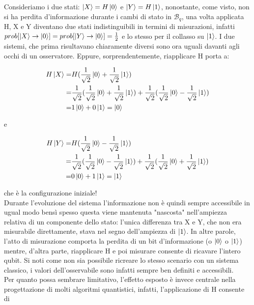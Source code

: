 \documentclass[12pt,a4paper,openright]{report}
\begin{document}
Consideriamo i due stati: $\ket{X} = H\ket0$ e $\ket{Y} = H\ket1$, nonostante, come visto, non si ha perdita d'informazione
durante i cambi di stato in $\mathcal{B}_q$, una volta applicata H, X e Y diventano due stati indistinguibili in termini di misurazioni, 
infatti $prob[\ket{X}\rightarrow\ket0]=prob[\ket{Y}\rightarrow\ket0]=\frac{1}{2}$ e lo stesso per il collasso su $\ket1$. I due sistemi, che prima risultavano chiaramente diversi sono ora uguali
davanti agli occhi di un osservatore. Eppure, sorprendentemente, riapplicare H porta a: 
\begin{center}
    \begin{align*}
        H\ket{X} =& H(\frac{1}{\sqrt2}\ket0 + \frac{1}{\sqrt2}\ket1) \\
                  =&\frac{1}{\sqrt2}(\frac{1}{\sqrt2}\ket0 + \frac{1}{\sqrt2}\ket1) + \frac{1}{\sqrt2}(\frac{1}{\sqrt2}\ket0 - \frac{1}{\sqrt2}\ket1) \\
                  =& 1\ket0 + 0\ket1 =\ket0
    \end{align*}
\end{center}
e
\begin{center}
    \begin{align*}
         H\ket{Y} =& H(\frac{1}{\sqrt2}\ket0 - \frac{1}{\sqrt2}\ket1) \\
                  =&\frac{1}{\sqrt2}(\frac{1}{\sqrt2}\ket0 - \frac{1}{\sqrt2}\ket1) + \frac{1}{\sqrt2}(\frac{1}{\sqrt2}\ket0 + \frac{1}{\sqrt2}\ket1) \\
                  =& 0\ket0 + 1\ket1 =\ket1
    \end{align*}
\end{center}
che è la configurazione iniziale!\\ Durante l'evoluzione del sistema l'informazione non è quindi sempre accessibile in ugual modo bensì
spesso questa viene mantenuta "nascosta" nell'ampiezza relativa di un componente dello stato: l'unica differenza tra X e Y, che non era misurabile direttamente,
stava nel segno dell'ampiezza di $\ket1$. In altre parole, l'atto di misurazione comporta la perdita di un bit d'informazione (o $\ket0$ o $\ket1$)  mentre, 
d'altra parte, riapplicare H e poi misurare consente di ricavare l'intero qubit. Si noti come non sia possibile ricreare lo stesso scenario con un sistema classico,
i valori dell'osservabile sono infatti sempre ben definiti e accessibili.\\
Per quanto possa sembrare limitativo, l'effetto esposto è invece centrale nella progettazione di molti algoritmi quantistici, infatti, l'applicazione di H consente di
\end{document}
